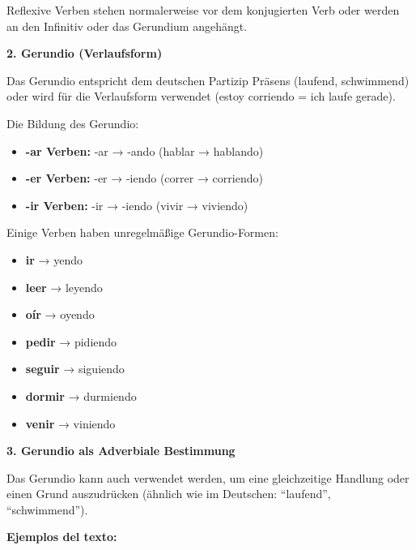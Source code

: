 \documentclass[12pt,a4paper]{article}
\begin{document}
Reflexive Verben stehen normalerweise vor dem konjugierten Verb oder werden an den Infinitiv oder das Gerundium angehängt.

\textbf{2. Gerundio (Verlaufsform)}

Das Gerundio entspricht dem deutschen Partizip Präsens (laufend, schwimmend) oder wird für die Verlaufsform verwendet (estoy corriendo = ich laufe gerade).

Die Bildung des Gerundio:
\begin{itemize}[leftmargin=*]
    \item \textbf{-ar Verben:} -ar → -ando (hablar → hablando)
    \item \textbf{-er Verben:} -er → -iendo (correr → corriendo)
    \item \textbf{-ir Verben:} -ir → -iendo (vivir → viviendo)
\end{itemize}

Einige Verben haben unregelmäßige Gerundio-Formen:
\begin{itemize}[leftmargin=*]
    \item \textbf{ir} → yendo
    \item \textbf{leer} → leyendo
    \item \textbf{oír} → oyendo
    \item \textbf{pedir} → pidiendo
    \item \textbf{seguir} → siguiendo
    \item \textbf{dormir} → durmiendo
    \item \textbf{venir} → viniendo
\end{itemize}

\textbf{3. Gerundio als Adverbiale Bestimmung}

Das Gerundio kann auch verwendet werden, um eine gleichzeitige Handlung oder einen Grund auszudrücken (ähnlich wie im Deutschen: \enquote{laufend}, \enquote{schwimmend}).

\textbf{Ejemplos del texto:}
\end{document}
